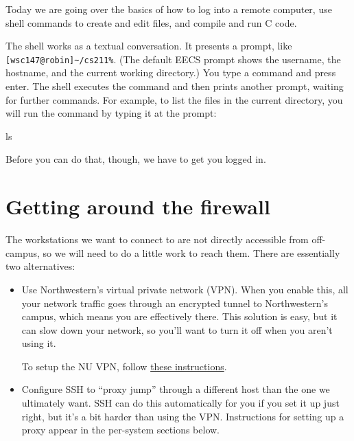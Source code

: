 \documentclass{tufte-handout}
\def\GlobalProtectUrl{https://kb.northwestern.edu/page.php?id=94726}
\begin{document}
\maketitle

Today we are going over the basics of how to log into a remote computer,
use shell commands to create and edit files, and compile and run C code.

The shell works as a textual conversation. It presents a prompt, like
\verb![wsc147@robin]~/cs211%!. (The default EECS prompt shows the
username, the hostname, and the current working directory.) You type a
command and press enter. The shell executes the command and then prints
another prompt, waiting for further commands. For example, to list the
files in the current directory, you will run the  command
by typing it at the prompt:

\begin{CmdLine*}
  \C ls \\
\end{CmdLine*}


\noindent
Before you can do that, though, we have to get you logged in.

\section{Getting around the firewall}

The workstations we want to connect to are not directly accessible from
off-campus, so we will need to do a little work to reach them. There are
essentially two alternatives:

\begin{itemize}

  \item Use Northwestern’s virtual private network (VPN). When you
    enable this, all your network traffic goes through an encrypted
    tunnel to Northwestern’s campus, which means you are effectively
    there. This solution is easy, but it can slow down your network, so
    you’ll want to turn it off when you aren’t using it.

    To setup the NU VPN, follow \href{\GlobalProtectUrl}{these
    instructions}.

  \item Configure SSH to ``proxy jump'' through a different host than
    the one we ultimately want. SSH can do this automatically for you if
    you set it up just right, but it’s a bit harder than using the VPN.
    Instructions for setting up a proxy appear in the per-system
    sections below.

\end{itemize}
\end{document}
